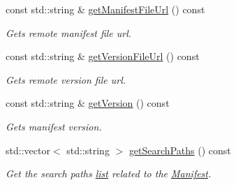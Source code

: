 \begin{DoxyCompactItemize}
const std\+::string \& \hyperlink{classManifest_a8af57959320ef283a9a56677aa22313e}{get\+Manifest\+File\+Url} () const
\begin{DoxyCompactList}\small\item\em Gets remote manifest file url. \end{DoxyCompactList}\item 
\mbox{\label{classManifest_a01fe55c0ac9aa949d2e0cb556dccd04c}} 
const std\+::string \& \hyperlink{classManifest_a01fe55c0ac9aa949d2e0cb556dccd04c}{get\+Version\+File\+Url} () const
\begin{DoxyCompactList}\small\item\em Gets remote version file url. \end{DoxyCompactList}\item 
\mbox{\label{classManifest_a04309e6afe15f79912459c43e9b85ec2}} 
const std\+::string \& \hyperlink{classManifest_a04309e6afe15f79912459c43e9b85ec2}{get\+Version} () const
\begin{DoxyCompactList}\small\item\em Gets manifest version. \end{DoxyCompactList}\item 
\mbox{\label{classManifest_a1fce17f961de5266f4af5bdbd035831f}} 
std\+::vector$<$ std\+::string $>$ \hyperlink{classManifest_a1fce17f961de5266f4af5bdbd035831f}{get\+Search\+Paths} () const
\begin{DoxyCompactList}\small\item\em Get the search paths \hyperlink{protocollist-p}{list} related to the \hyperlink{classManifest}{Manifest}. \end{DoxyCompactList}\end{DoxyCompactItemize}
